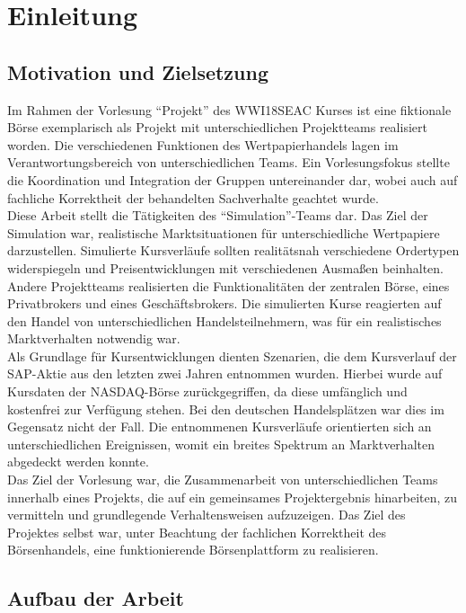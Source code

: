 \chapter{Einleitung}
\section{Motivation und Zielsetzung}

	
	Im Rahmen der Vorlesung \enquote{Projekt} des WWI18SEAC Kurses ist eine fiktionale Börse exemplarisch als Projekt mit unterschiedlichen Projektteams realisiert worden. Die verschiedenen Funktionen des Wertpapierhandels lagen im Verantwortungsbereich von unterschiedlichen Teams. Ein Vorlesungsfokus stellte die Koordination und Integration der Gruppen untereinander dar, wobei auch auf fachliche Korrektheit der behandelten Sachverhalte geachtet wurde.\\
	Diese Arbeit stellt die Tätigkeiten des \enquote{Simulation}-Teams dar. Das Ziel der Simulation war, realistische Marktsituationen für unterschiedliche Wertpapiere darzustellen. Simulierte Kursverläufe sollten realitätsnah verschiedene Ordertypen widerspiegeln und Preisentwicklungen mit verschiedenen Ausmaßen beinhalten. \\
	Andere Projektteams realisierten die Funktionalitäten der zentralen Börse, eines Privatbrokers und eines Geschäftsbrokers. Die simulierten Kurse reagierten auf den Handel von unterschiedlichen Handelsteilnehmern, was für ein realistisches Marktverhalten notwendig war.\\
	Als Grundlage für Kursentwicklungen dienten Szenarien, die dem Kursverlauf der SAP-Aktie aus den letzten zwei Jahren entnommen wurden. Hierbei wurde auf Kursdaten der NASDAQ-Börse zurückgegriffen, da diese umfänglich und kostenfrei zur Verfügung stehen. Bei den deutschen Handelsplätzen war dies im Gegensatz nicht der Fall. Die entnommenen Kursverläufe orientierten sich an unterschiedlichen Ereignissen, womit ein breites Spektrum an Marktverhalten abgedeckt werden konnte.\\
	Das Ziel der Vorlesung war, die Zusammenarbeit von unterschiedlichen Teams innerhalb eines Projekts, die auf ein gemeinsames Projektergebnis hinarbeiten, zu vermitteln und grundlegende Verhaltensweisen aufzuzeigen. Das Ziel des Projektes selbst war, unter Beachtung der fachlichen Korrektheit des Börsenhandels, eine funktionierende Börsenplattform zu realisieren.


\section{Aufbau der Arbeit}

